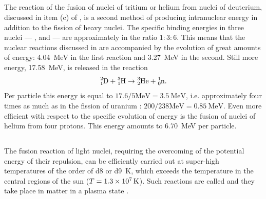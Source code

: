\subsection{}\label{42.9.13} The reaction of the fusion of nuclei of tritium or helium from nuclei of deuterium, discussed in item (c) of , is a second method of producing intranuclear energy in addition to the fission of heavy nuclei. The specific binding energies  in three nuclei --- ,  and  --- are approximately in the ratio $1:3:6$. This means that the nuclear reactions discussed in  are accompanied by the evolution of great amounts of energy: \SI{4.04}{\MeV} in the first reaction and \SI{3.27}{\MeV} in the second. Still more energy, \SI{17.58}{\MeV}, is released in the reaction
\begin{equation*}
\ce{^{2}_{1}D} + \ce{^{3}_{1}H} \to \ce{^{3}_{2}He} + \ce{^{1}_{0}n}.
\end{equation*}
Per particle this energy is equal to $17.6/5 \si{\MeV} = \SI{3.5}{\MeV}$, i.e. approximately four times as much as in the fission of uranium  : $200/238 \si{\MeV} = \SI{0.85}{\MeV}$. Even more efficient with respect to the specific evolution of energy is the fusion of nuclei of helium  from four protons. This energy amounts to \SI{6.70}{\MeV} per particle.

\subsection{}\label{42.9.14} The fusion reaction of light nuclei, requiring the overcoming of the potential energy of their repulsion, can be efficiently carried out at super-high temperatures of the order of \num{d8} or \SI{d9}{\kelvin}, which exceeds the temperature in the central regions of the sun ($T = \SI{1.3d7}{\kelvin}$). Such reactions are called  and they take place in matter in a plasma state . 

